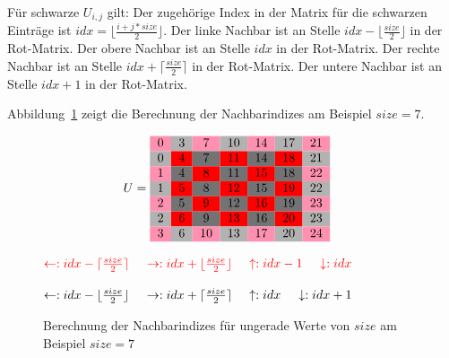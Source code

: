\documentclass{article}
\begin{document}
Für schwarze $U_{i,j}$ gilt: Der zugehörige Index in der Matrix für die schwarzen Einträge ist $idx = \lfloor\frac{i+j*size}{2}\rfloor$. Der linke Nachbar ist an Stelle $idx - \lfloor\frac{size}{2}\rfloor$ in der Rot-Matrix. Der obere Nachbar ist an Stelle $idx$ in der Rot-Matrix. Der rechte Nachbar ist an Stelle $idx + \lceil\frac{size}{2}\rceil$ in der Rot-Matrix. Der untere Nachbar ist an Stelle $idx + 1$ in der Rot-Matrix.

Abbildung~\ref{fig:matrix:odd} zeigt die Berechnung der Nachbarindizes am Beispiel $size=7$.

\begin{figure}[h!]
\centering
$$U = 
\begin{tabular}{ccccccc}
  \cellcolor{rose}0 & \cellcolor[gray]{0.7}3 & \cellcolor{rose}7 & \cellcolor[gray]{0.7}10 & \cellcolor{rose}14 & \cellcolor[gray]{0.7}17 & \cellcolor{rose}21 \\
  
 \cellcolor[gray]{0.7}0 & \cellcolor{red}4 & \cellcolor[gray]{0.45}7 & \cellcolor{red}11 & \cellcolor[gray]{0.45}14 & \cellcolor{red}18 & \cellcolor[gray]{0.7}21\\
 
  \cellcolor{rose}1 & \cellcolor[gray]{0.45}4 & \cellcolor{red}8 & \cellcolor[gray]{0.45}11 & \cellcolor{red}15 & \cellcolor[gray]{0.45}18 & \cellcolor{rose}22\\
  
 \cellcolor[gray]{0.7}1 & \cellcolor{red}5 & \cellcolor[gray]{0.45}8 & \cellcolor{red}12 & \cellcolor[gray]{0.45}15 & \cellcolor{red}19 & \cellcolor[gray]{0.7}22\\
 
 \cellcolor{rose}2 & \cellcolor[gray]{0.45}5 & \cellcolor{red}9 & \cellcolor[gray]{0.45}12 & \cellcolor{red}16 & \cellcolor[gray]{0.45}19 & \cellcolor{rose}23\\
 
 \cellcolor[gray]{0.7}2 & \cellcolor{red}6 & \cellcolor[gray]{0.45}9 & \cellcolor{red}13 & \cellcolor[gray]{0.45}16 & \cellcolor{red}20 & \cellcolor[gray]{0.7}23\\
 
 \cellcolor{rose}3 & \cellcolor[gray]{0.7}6 & \cellcolor{rose}10 & \cellcolor[gray]{0.7}13 & \cellcolor{rose}17 & \cellcolor[gray]{0.7}20 & \cellcolor{rose}24 \\
\end{tabular} \quad
$$


$\textcolor{red}{\leftarrow: idx - \lceil\frac{size}{2}\rceil} \quad$
$\textcolor{red}{\rightarrow: idx + \lfloor\frac{size}{2}\rfloor} \quad$
$\textcolor{red}{\uparrow: idx - 1} \quad$
$\textcolor{red}{\downarrow: idx} \quad$

$\textcolor{black}{\leftarrow: idx - \lfloor\frac{size}{2}\rfloor} \quad$
$\textcolor{black}{\rightarrow: idx + \lceil\frac{size}{2}\rceil} \quad$
$\textcolor{black}{\uparrow: idx} \quad$
$\textcolor{black}{\downarrow: idx + 1} \quad$

\caption{Berechnung der Nachbarindizes für ungerade Werte von $size$ am Beispiel $size=7$}
\label{fig:matrix:odd}
\end{figure}
\end{document}

